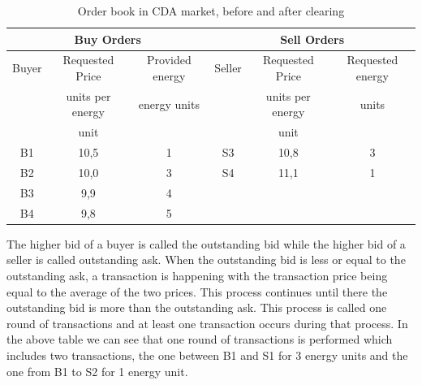 \begin{table}[h!]
\begin{minipage}[c]{\textwidth}
\begin{tabular}{|c|c|c|c|c|c|}
            \hline
            \multicolumn{3}{|c|}{\textbf{Buy Orders}} & \multicolumn{3}{|c|}{\textbf{Sell Orders}}                                                                  \\
            \hline
            Buyer                                     & Requested Price                            & Provided energy & Seller & Requested Price  & Requested energy \\
                                                      & units per energy                           & energy units    &        & units per energy & units            \\
                                                      & unit                                       &                 &        & unit             &                  \\
            \hline
            B1                                        & 10,5                                       & 1               & S3     & 10,8             & 3                \\
            B2                                        & 10,0                                       & 3               & S4     & 11,1             & 1                \\
            B3                                        & 9,9                                        & 4               &        &                  &                  \\
            B4                                        & 9,8                                        & 5               &        &                  &                  \\
            \hline
        \end{tabular}
    \end{minipage}
    \caption{Order book in CDA market, before and after clearing}
\end{table}

The higher bid of a buyer is called the outstanding bid while the higher bid of a seller is called outstanding ask. When the outstanding bid is less or equal to the outstanding
ask, a transaction is happening with the transaction price being equal to the average of the two prices. This process continues until there the outstanding bid is more than the
outstanding ask. This process is called one round of transactions and at least one transaction occurs during that process. In the above table we can see that one round of transactions
is performed which includes two transactions, the one between B1 and S1 for 3 energy units and the one from B1 to S2 for 1 energy unit. \cite{wang2017novel}


